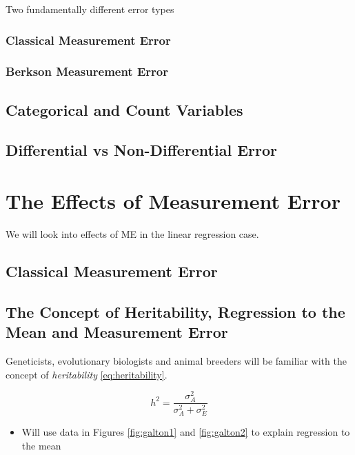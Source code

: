 \documentclass[]{book}
\providecommand{\tightlist}{%
  \setlength{\itemsep}{0pt}\setlength{\parskip}{0pt}}
\theoremstyle{definition}
\theoremstyle{definition}
\theoremstyle{definition}
\theoremstyle{remark}
\begin{document}
Two fundamentally different error types

\subsection{Classical Measurement
Error}\label{classical-measurement-error}

\subsection{Berkson Measurement Error}\label{berkson-measurement-error}

\section{Categorical and Count
Variables}\label{categorical-and-count-variables}

\section{Differential vs Non-Differential
Error}\label{differential-vs-non-differential-error}

\chapter{The Effects of Measurement Error}\label{effects}

We will look into effects of ME in the linear regression case.

\section{Classical Measurement
Error}\label{classical-measurement-error-1}

\section{The Concept of Heritability, Regression to the Mean and
Measurement Error}\label{sec:heritability}

Geneticists, evolutionary biologists and animal breeders will be
familiar with the concept of \emph{heritability} \eqref{eq:heritability}.

\begin{equation}
h^2 = \frac{\sigma_A^2}{\sigma_A^2 + \sigma_E^2}
\label{eq:heritability}
\end{equation}

\begin{itemize}
\tightlist
\item
  Will use data in Figures \ref{fig:galton1} and \ref{fig:galton2} to
  explain regression to the mean
\end{itemize}
\end{document}
